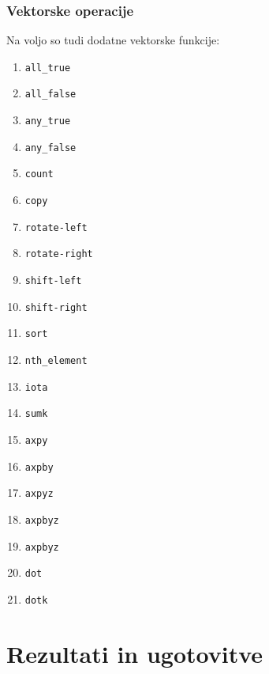 \documentclass[12pt,titlepage]{report}
\begin{document}
		\subsection{Vektorske operacije}
			Na voljo so tudi dodatne vektorske funkcije:
			\begin{multicols}{3}
			\begin{enumerate}
				\item \texttt{all\_true}
				\item \texttt{all\_false}
				\item \texttt{any\_true}
				\item \texttt{any\_false}
				\item \texttt{count}
				\item \texttt{copy}
				\item \texttt{rotate-left}
				\item \texttt{rotate-right}
				\item \texttt{shift-left}
				\item \texttt{shift-right}
				\item \texttt{sort}
				\item \texttt{nth\_element}
				\item \texttt{iota}
				\item \texttt{sumk}
				\item \texttt{axpy}
				\item \texttt{axpby}
				\item \texttt{axpyz}
				\item \texttt{axpbyz}
				\item \texttt{axpbyz}
				\item \texttt{dot}
				\item \texttt{dotk}
			\end{enumerate}
			\end{multicols}
			
\chapter{Rezultati in ugotovitve}



\newpage
\printbibliography
\end{document}
